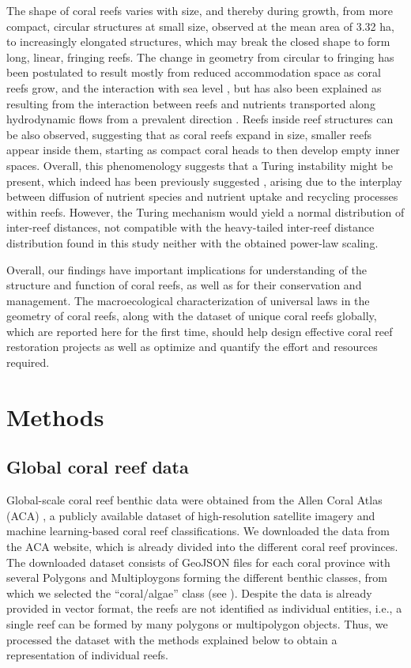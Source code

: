The shape of coral reefs varies with size, and thereby during growth, from
more compact, circular structures at small size, observed at the mean area of
3.32 ha, to increasingly elongated structures, which may break the closed shape
to form long, linear, fringing reefs. The change in geometry from circular to
fringing has been postulated to result mostly from reduced accommodation space
as coral reefs grow, and the interaction with sea level \cite{Kennedy2002}, but
has also been explained as resulting from the interaction between reefs and
nutrients transported along hydrodynamic flows from a prevalent direction
\cite{Mistr2003}. Reefs inside reef structures can be also observed, suggesting
that as coral reefs expand in size, smaller reefs appear inside them, starting
as compact coral heads to then develop empty inner spaces. Overall, this
phenomenology suggests that a Turing instability
\cite{turing1952chemical,CrossGreensidebook} might be present, which indeed has
been previously suggested \cite{Mistr2003}, arising due to the interplay
between diffusion of nutrient species and nutrient uptake and recycling
processes within reefs. However, the Turing mechanism would yield a normal
distribution of inter-reef distances, not compatible with the heavy-tailed
inter-reef distance distribution found in this study neither with the obtained
power-law scaling.

Overall, our findings have important implications for understanding of the
structure and function of coral reefs, as well as for their conservation and
management. The macroecological characterization of universal laws in the
geometry of coral reefs, along with the dataset of unique coral reefs globally,
which are reported here for the first time, should help design effective coral
reef restoration projects as well as optimize and quantify the effort and
resources required.

\section{Methods}

\subsection{Global coral reef data}

Global-scale coral reef benthic data were obtained from the Allen Coral
Atlas (ACA) \cite{allen-coral-atlas}, a publicly available dataset of
high-resolution satellite imagery and machine learning-based coral reef
classifications. We downloaded the data from the ACA website, which is already
divided into the different coral reef provinces. The downloaded dataset
consists of GeoJSON files for each coral province with several Polygons and
Multiploygons forming the different benthic classes, from which we selected the
``coral/algae'' class (see \cite{allen-coral-atlas}). Despite the data is
already provided in vector format, the reefs are not identified as individual
entities, i.e., a single reef can be formed by many polygons or multipolygon
objects. Thus, we processed the dataset with the methods explained below to
obtain a representation of individual reefs.

